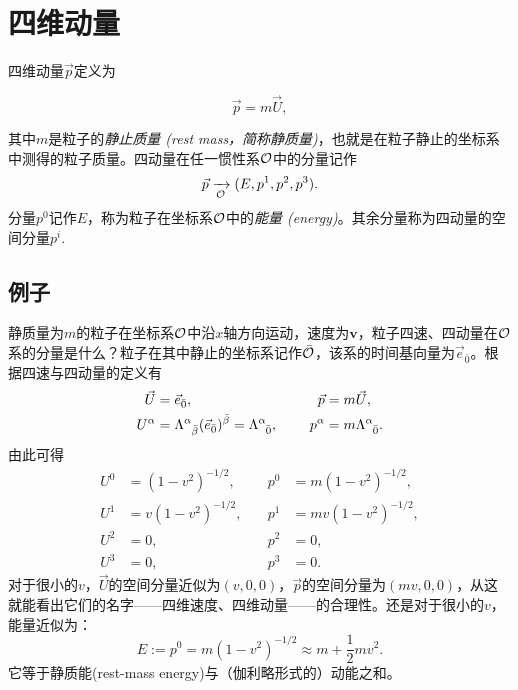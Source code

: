 \section{四维动量}
\label{sec2.4}
四维动量$\vec{p}$定义为
\begin{shaded}
\begin{equation}
    \vec{p} = m \vec{U},
\label{equ2.19}
\end{equation}
\end{shaded}
其中$m$是粒子的\textit{静止质量 (rest mass，简称静质量)}，也就是在粒子静止的坐标系中测得的粒子质量。四动量在任一惯性系$\mathcal{O}$中的分量记作
\begin{equation}
    \vec{p} \xrightarrow[\mathcal{O}]{ } (E, p^1, p^2, p^3).
\label{equ2.20}
\end{equation}
分量$p^0$记作$E$，称为粒子在坐标系$\mathcal{O}$中的\textit{能量 (energy)}。其余分量称为四动量的空间分量$p^i$.

\subsection*{例子}
静质量为$m$的粒子在坐标系$\mathcal{O}$中沿$x$轴方向运动，速度为$\bm{v}$，粒子四速、四动量在$\mathcal{O}$系的分量是什么？粒子在其中静止的坐标系记作$\bar{\mathcal{O}}$，该系的时间基向量为$\vec{e}_{\bar{0}}$。根据四速与四动量的定义有
\begin{equation}
\begin{split}
    \vec{U} &= \vec{e}_{\bar{0}}, & \quad \vec{p} &= m\vec{U}, \\
    U^\alpha &= \Lambda\indices{^\alpha_{\bar{\beta}}} ( \vec{e}_{\bar{0}} )^{\bar{\beta}} = \Lambda\indices{^\alpha_{\bar{0}}}, \quad & p^\alpha &= m \Lambda\indices{^\alpha_{\bar{0}}}.
\end{split}
\label{equ2.21}
\end{equation}
由此可得
\begin{align*}
    U^0 &= (1 - v^2)^{-1/2}, \quad & p^0 &= m(1 - v^2)^{-1/2}, \\
    U^1 &= v (1 - v^2)^{-1/2}, \quad & p^1 &= mv (1 - v^2)^{-1/2}, \\
    U^2 &= 0, \quad & p^2 &= 0, \\
    U^3 &= 0, \quad & p^3 &= 0.
\end{align*}
对于很小的$v$，$\vec{U}$的空间分量近似为$(v, 0, 0)$，$\vec{p}$的空间分量为$(mv, 0, 0)$，从这就能看出它们的名字——四维速度、四维动量——的合理性。还是对于很小的$v$，能量近似为：
\begin{equation*}
    E := p^0 = m (1 - v^2)^{-1/2} \approx m + \frac{1}{2} m v^2.
\end{equation*}
它等于静质能(rest-mass energy)与（伽利略形式的）动能之和。

